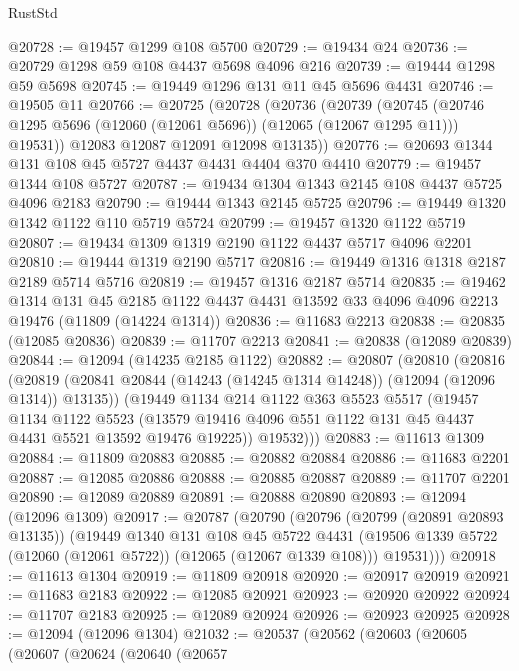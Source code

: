 \begin{lexlean}{RustStd}
\begin{coremodule}
@20728 := @19457 @1299 @108 @5700
@20729 := @19434 @24
@20736 := @20729 @1298 @59 @108 @4437 @5698 @4096 @216
@20739 := @19444 @1298 @59 @5698
@20745 := @19449 @1296 @131 @11 @45 @5696 @4431
@20746 := @19505 @11
@20766 := @20725
    (@20728
      (@20736
        (@20739
          (@20745 (@20746 @1295 @5696 (@12060 (@12061 @5696)) (@12065 (@12067 @1295 @11))) @19531))
        @12083
        @12087
        @12091
        @12098
        @13135))
@20776 := @20693 @1344 @131 @108 @45 @5727 @4437 @4431 @4404 @370 @4410
@20779 := @19457 @1344 @108 @5727
@20787 := @19434 @1304 @1343 @2145 @108 @4437 @5725 @4096 @2183
@20790 := @19444 @1343 @2145 @5725
@20796 := @19449 @1320 @1342 @1122 @110 @5719 @5724
@20799 := @19457 @1320 @1122 @5719
@20807 := @19434 @1309 @1319 @2190 @1122 @4437 @5717 @4096 @2201
@20810 := @19444 @1319 @2190 @5717
@20816 := @19449 @1316 @1318 @2187 @2189 @5714 @5716
@20819 := @19457 @1316 @2187 @5714
@20835 := @19462
    @1314
    @131
    @45
    @2185
    @1122
    @4437
    @4431
    @13592
    @33
    @4096
    @4096
    @2213
    @19476
    (@11809 (@14224 @1314))
@20836 := @11683 @2213
@20838 := @20835 (@12085 @20836)
@20839 := @11707 @2213
@20841 := @20838 (@12089 @20839)
@20844 := @12094 (@14235 @2185 @1122)
@20882 := @20807
    (@20810
      (@20816
        (@20819 (@20841 @20844 (@14243 (@14245 @1314 @14248)) (@12094 (@12096 @1314)) @13135))
        (@19449
          @1134
          @214
          @1122
          @363
          @5523
          @5517
          (@19457
            @1134
            @1122
            @5523
            (@13579 @19416 @4096 @551 @1122 @131 @45 @4437 @4431 @5521 @13592 @19476 @19225))
          @19532)))
@20883 := @11613 @1309
@20884 := @11809 @20883
@20885 := @20882 @20884
@20886 := @11683 @2201
@20887 := @12085 @20886
@20888 := @20885 @20887
@20889 := @11707 @2201
@20890 := @12089 @20889
@20891 := @20888 @20890
@20893 := @12094 (@12096 @1309)
@20917 := @20787
    (@20790
      (@20796
        (@20799 (@20891 @20893 @13135))
        (@19449
          @1340
          @131
          @108
          @45
          @5722
          @4431
          (@19506 @1339 @5722 (@12060 (@12061 @5722)) (@12065 (@12067 @1339 @108)))
          @19531)))
@20918 := @11613 @1304
@20919 := @11809 @20918
@20920 := @20917 @20919
@20921 := @11683 @2183
@20922 := @12085 @20921
@20923 := @20920 @20922
@20924 := @11707 @2183
@20925 := @12089 @20924
@20926 := @20923 @20925
@20928 := @12094 (@12096 @1304)
@21032 := @20537
    (@20562
      (@20603
        (@20605
          (@20607
            (@20624
              (@20640
                (@20657

\end{coremodule}
\end{lexlean}
